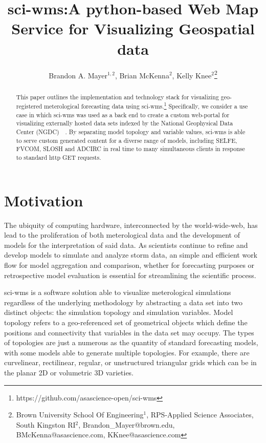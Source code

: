 \documentclass[11pt,twocolumn,twoside]{IEEEtran}
\begin{document}
\title{\vspace{0.2in}\sc sci-wms:A python-based Web Map Service for Visualizing Geospatial data}

\author{Brandon A. Mayer$^{1,2}$, Brian McKenna$^{2}$, Kelly Knee$^{2}$\thanks{Brown University School Of Engineering$^{1}$, RPS-Applied Science Associates, South Kingston RI$^{2}$, Brandon\_Mayer@brown.edu, BMcKenna@asascience.com, KKnee@asascience.com}}

\maketitle
\thispagestyle{fancy}

\begin{abstract}
This paper outlines the implementation and technology stack for
visualizing geo-registered meterological forecasting data using
sci-wms.\footnote{https://github.com/asascience-open/sci-wms}
Specifically, we consider a use case in which sci-wms was used as a
back end to create a custom web-portal for visualizing externally
hosted data sets indexed by the National Geophysical Data Center
(NGDC)~\cite{luettich13}~\cite{luettich12}. By separating model topology and variable values, sci-wms is
able to serve custom generated content for a diverse range of models,
including SELFE, FVCOM, SLOSH and ADCIRC in real time to many
simultaneous clients in response to standard http GET requests.
\end{abstract}

\section{Motivation}
The ubiquity of computing hardware, interconnected by the
world-wide-web, has lead to the proliferation of both meterological
data and the development of models for the interpretation of said
data. As scientists continue to refine and develop models to simulate
and analyze storm data, an simple and efficient work flow for model
aggregation and comparison, whether for forecasting purposes or
retrospective model evaluation is essential for streamlining the
scientific process.

sci-wms is a software solution able to visualize meterological
simulations regardless of the underlying methodology by abstracting a
data set into two distinct objects: the simulation topology and
simulation variables. Model topology refers to a geo-referenced set of
geometrical objects which define the positions and connectivity that
variables in the data set may occupy. The types of topologies are just
a numerous as the quantity of standard forecasting models, with some
models able to generate multiple topologies. For example, there are
curvelinear, rectilinear, regular, or unstructured triangular grids
which can be in the planar 2D or volumetric 3D varieties.
\end{document}
